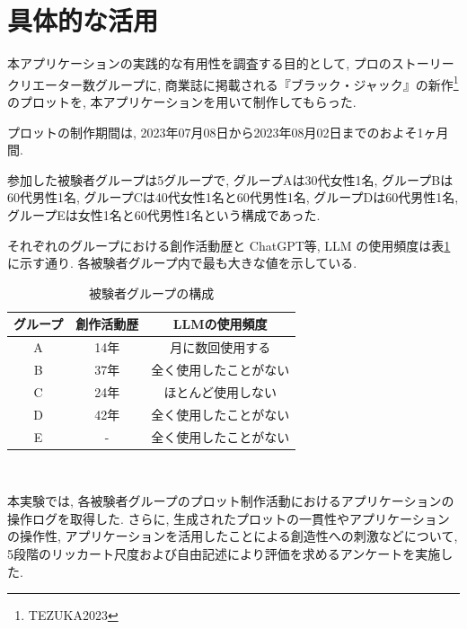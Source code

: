 \section{具体的な活用}
本アプリケーションの実践的な有用性を調査する目的として, プロのストーリークリエーター数グループに, 商業誌に掲載される『ブラック・ジャック』の新作\footnote{TEZUKA2023}のプロットを, 本アプリケーションを用いて制作してもらった.

プロットの制作期間は, 2023年07月08日から2023年08月02日までのおよそ1ヶ月間.

参加した被験者グループは5グループで, グループAは30代女性1名, グループBは60代男性1名, グループCは40代女性1名と60代男性1名, グループDは60代男性1名, グループEは女性1名と60代男性1名という構成であった.

それぞれのグループにおける創作活動歴と ChatGPT\cite{ref:OpenAI23}等, LLM の使用頻度は表\ref{group}に示す通り. 各被験者グループ内で最も大きな値を示している.

\begin{table}[hbtp]
\begin{center}
{\caption{被験者グループの構成}
\label{group}
\footnotesize
\begin{tabular}{ccc} \hline
グループ & 創作活動歴 & LLMの使用頻度  \\ \hline
A & 14年 & 月に数回使用する\\
B & 37年 & 全く使用したことがない\\
C & 24年 & ほとんど使用しない\\
D & 42年 & 全く使用したことがない\\
E & - & 全く使用したことがない \\
\hline
\end{tabular}
}
\end{center}
\end{table}
\

本実験では, 各被験者グループのプロット制作活動におけるアプリケーションの操作ログを取得した. さらに, 生成されたプロットの一貫性やアプリケーションの操作性, アプリケーションを活用したことによる創造性への刺激などについて, 5段階のリッカート尺度および自由記述により評価を求めるアンケートを実施した.